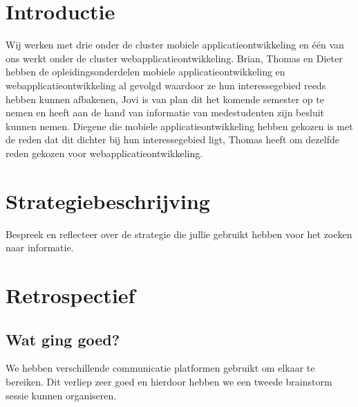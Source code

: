 \documentclass[fleqn,10pt]{voorstel}
\begin{document}
\flushbottom %

\maketitle %

\tableofcontents %

\thispagestyle{empty} %


\section{Introductie} %
Wij werken met drie onder de cluster mobiele applicatieontwikkeling en één van ons werkt onder de cluster webapplicatieontwikkeling. Brian, Thomas en Dieter hebben de opleidingsonderdelen mobiele applicatieontwikkeling en webapplicatieontwikkeling
al gevolgd waardoor ze hun interessegebied reeds hebben kunnen afbakenen, Jovi is van plan dit het komende semester op te nemen en heeft aan de hand van informatie van medestudenten zijn besluit kunnen nemen.
Diegene die mobiele applicatieontwikkeling hebben gekozen is met de reden dat dit dichter bij hun interessegebied ligt, Thomas heeft om dezelfde reden gekozen voor webapplicatieontwikkeling.

\section{Strategiebeschrijving}
Bespreek en reflecteer over de strategie die jullie gebruikt hebben voor het zoeken naar informatie.

\section{Retrospectief}
\subsection{Wat ging goed?}
We hebben verschillende communicatie platformen gebruikt om elkaar te bereiken. Dit verliep zeer goed en hierdoor hebben we een tweede brainstorm sessie kunnen organiseren.
\end{document}
